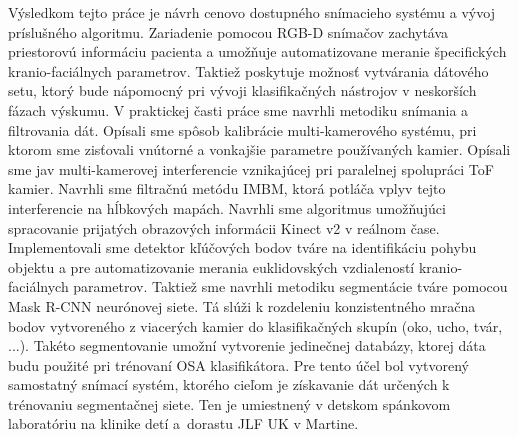 Výsledkom tejto práce je návrh cenovo dostupného snímacieho systému a vývoj príslušného algoritmu. Zariadenie pomocou RGB-D snímačov zachytáva priestorovú informáciu pacienta a umožňuje automatizovane meranie špecifických kranio-faciálnych parametrov. Taktiež poskytuje možnosť vytvárania dátového setu, ktorý bude nápomocný pri vývoji klasifikačných nástrojov v neskorších fázach výskumu. 
\newpage
V praktickej časti práce sme navrhli metodiku snímania a filtrovania dát. Opísali sme spôsob kalibrácie multi-kamerového systému, pri ktorom sme zisťovali vnútorné a vonkajšie parametre používaných kamier. Opísali sme jav multi-kamerovej interferencie vznikajúcej pri paralelnej spolupráci ToF kamier. Navrhli sme filtračnú metódu IMBM, ktorá potláča vplyv tejto interferencie na hĺbkových mapách. Navrhli sme algoritmus umožňujúci spracovanie prijatých obrazových informácii Kinect v2 v reálnom čase. Implementovali sme detektor kľúčových bodov tváre na identifikáciu pohybu objektu a pre automatizovanie merania euklidovských vzdialeností kranio-faciálnych parametrov. Taktiež sme navrhli metodiku segmentácie tváre pomocou Mask R-CNN neurónovej siete. Tá slúži k rozdeleniu konzistentného mračna bodov vytvoreného z viacerých kamier do klasifikačných skupín (oko, ucho, tvár, ...). Takéto segmentovanie umožní vytvorenie jedinečnej databázy, ktorej dáta budu použité pri trénovaní OSA klasifikátora. Pre tento účel bol vytvorený samostatný snímací systém, ktorého cieľom je získavanie dát určených k trénovaniu segmentačnej siete. Ten je umiestnený v detskom spánkovom laboratóriu na klinike detí a dorastu JLF UK v Martine. 


